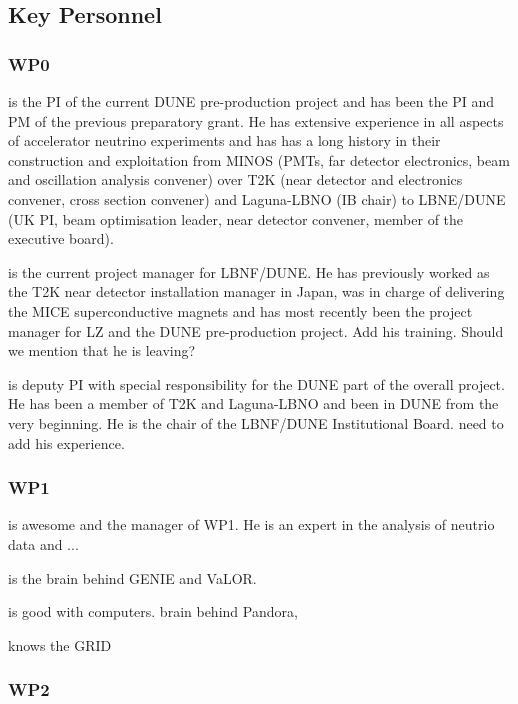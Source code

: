 \subsection{Key Personnel}
\subsubsection{WP0}

{} is the PI of the current DUNE pre-production project and has been the PI and PM of the previous preparatory grant. He has extensive experience in all aspects of accelerator neutrino experiments and has has a long history in their construction and exploitation from MINOS (PMTs, far detector electronics, beam and oscillation analysis convener) over T2K (near detector and electronics convener, cross section convener) and Laguna-LBNO (IB chair) to LBNE/DUNE (UK PI, beam optimisation leader, near detector convener, member of the executive board).

 is the current project manager for LBNF/DUNE. He has previously worked as the T2K near detector installation manager in Japan, was in charge of delivering the MICE superconductive magnets and has most recently been the project manager for LZ and the DUNE pre-production project. 
{\color{red}Add his training. Should we mention that he is leaving?}

 is deputy PI with special responsibility for the DUNE part of the overall project. He has been a member of T2K and Laguna-LBNO and been in DUNE from the very beginning. He is the chair of the LBNF/DUNE Institutional Board. {\color{red} need to add his experience.}

\subsubsection{WP1}

 is awesome and the manager of WP1. He is an expert in the analysis of neutrio data and ...

 is the brain behind GENIE and VaLOR. 

 is good with computers. brain behind Pandora, 


 knows the GRID

\subsubsection{WP2}

